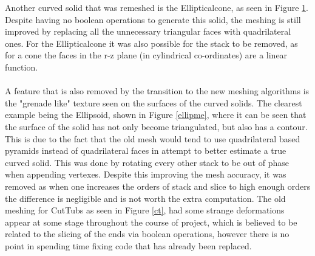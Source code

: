 \documentclass[12pt,a4paper]{article}
\begin{document}
\begin{figure}[h!]
\begin{minipage}{.4\textwidth}
  \label{elco1}
\end{minipage}%
\end{figure}

\noindent Another curved solid that was remeshed is the Ellipticalcone, as seen in Figure \ref{elco1}. Despite having no boolean operations to generate this solid, the meshing is still improved by replacing all the unnecessary triangular faces with quadrilateral ones. For the Ellipticalcone it was also possible for the stack to be removed, as for a cone the faces in the r-z plane (in cylindrical co-ordinates) are a linear function.
\\\\
\noindent A feature that is also removed by the transition to the new meshing algorithms is the "grenade like" texture seen on the surfaces of the curved solids. The clearest example being the Ellipsoid, shown in Figure \ref{ellipme}, where it can be seen that the surface of the solid has not only become triangulated, but also has a contour. This is due to the fact that the old mesh would tend to use quadrilateral based pyramids instead of quadrilateral faces in attempt to better estimate a true curved solid. This was done by rotating every other stack to be out of phase when appending vertexes. Despite this improving the mesh accuracy, it was removed as when one increases the orders of stack and slice to high enough orders the difference is negligible and is not worth the extra computation.  The old meshing for CutTubs as seen in Figure \ref{ct}, had some strange deformations appear at some stage throughout the course of project, which is believed to be related to the slicing of the ends via boolean operations, however there is no point in spending time fixing code that has already been replaced.
\end{document}
